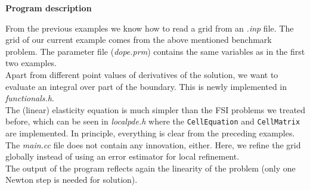 \vspace{0.2cm}

\textbf{Program description}

\vspace{0.2cm}

From the previous examples we know how to read a grid from an \textit{.inp} file. The grid of our current example comes from the above mentioned benchmark problem. The parameter file (\textit{dope.prm}) contains the same variables as in the first two examples.\\
Apart from different point values of derivatives of the solution, we want to evaluate an integral over part of the boundary.   This is newly implemented in \textit{functionals.h}.\\
The (linear) elasticity equation is much simpler than the FSI problems we treated before, which can be seen in \textit{localpde.h} where the \texttt{CellEquation} and \texttt{CellMatrix} are implemented. In principle, everything is clear from the preceding examples.\\
The \textit{main.cc} file does not contain any innovation, either. Here, we refine the grid globally instead of using an error estimator for local refinement.\\
The output of the program reflects again the linearity of the problem (only one Newton step is needed for solution).\\
